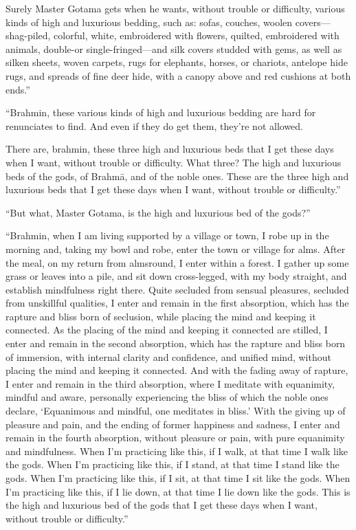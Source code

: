 \documentclass[12pt,openany]{book}%
\begin{document}
Surely Master Gotama gets when he wants, without trouble or difficulty, various kinds of high and luxurious bedding, such as: sofas, couches, woolen covers—shag-piled, colorful, white, embroidered with flowers, quilted, embroidered with animals, double-or single-fringed—and silk covers studded with gems, as well as silken sheets, woven carpets, rugs for elephants, horses, or chariots, antelope hide rugs, and spreads of fine deer hide, with a canopy above and red cushions at both ends.” 

“Brahmin, these various kinds of high and luxurious bedding are hard for renunciates to find. And even if they do get them, they’re not allowed. 

There are, brahmin, these three high and luxurious beds that I get these days when I want, without trouble or difficulty. What three? The high and luxurious beds of the gods, of \textsanskrit{Brahmā}, and of the noble ones. These are the three high and luxurious beds that I get these days when I want, without trouble or difficulty.” 

“But what, Master Gotama, is the high and luxurious bed of the gods?” 

“Brahmin, when I am living supported by a village or town, I robe up in the morning and, taking my bowl and robe, enter the town or village for alms. After the meal, on my return from almsround, I enter within a forest. I gather up some grass or leaves into a pile, and sit down cross-legged, with my body straight, and establish mindfulness right there. Quite secluded from sensual pleasures, secluded from unskillful qualities, I enter and remain in the first absorption, which has the rapture and bliss born of seclusion, while placing the mind and keeping it connected. As the placing of the mind and keeping it connected are stilled, I enter and remain in the second absorption, which has the rapture and bliss born of immersion, with internal clarity and confidence, and unified mind, without placing the mind and keeping it connected. And with the fading away of rapture, I enter and remain in the third absorption, where I meditate with equanimity, mindful and aware, personally experiencing the bliss of which the noble ones declare, ‘Equanimous and mindful, one meditates in bliss.’ With the giving up of pleasure and pain, and the ending of former happiness and sadness, I enter and remain in the fourth absorption, without pleasure or pain, with pure equanimity and mindfulness. When I’m practicing like this, if I walk, at that time I walk like the gods. When I’m practicing like this, if I stand, at that time I stand like the gods. When I’m practicing like this, if I sit, at that time I sit like the gods. When I’m practicing like this, if I lie down, at that time I lie down like the gods. This is the high and luxurious bed of the gods that I get these days when I want, without trouble or difficulty.” 
\end{document}
